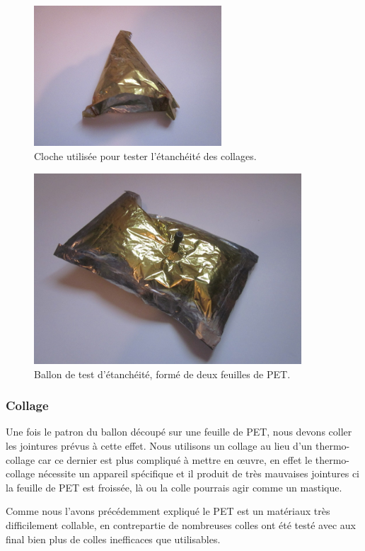 \documentclass[a4paper,11pt]{article}
\begin{document}
\begin{figure}[H]
 \centering
 \includegraphics[width=7cm]{../Images/cloche_colle.JPG}
 \caption{Cloche utilisée pour tester l'étanchéité des collages.}
\end{figure}

\begin{figure}[H]
 \centering
 \includegraphics[width=10cm]{../Images/ballon_etanche.JPG}
 \caption{Ballon de test d'étanchéité, formé de deux feuilles de PET.}
\end{figure}


\subsubsection{Collage}

Une fois le patron du ballon découpé sur une feuille de PET, nous devons coller les jointures prévus à cette effet. Nous utilisons un collage au lieu d'un thermo-collage car ce dernier est plus compliqué à mettre en œuvre, en effet le thermo-collage nécessite un appareil spécifique et il produit de très mauvaises jointures ci la feuille de PET est froissée, là ou la colle pourrais agir comme un mastique.

Comme nous l'avons précédemment expliqué le PET est un matériaux très difficilement collable, en contrepartie de nombreuses colles ont été testé avec aux final bien plus de colles inefficaces que utilisables. 
\end{document}
